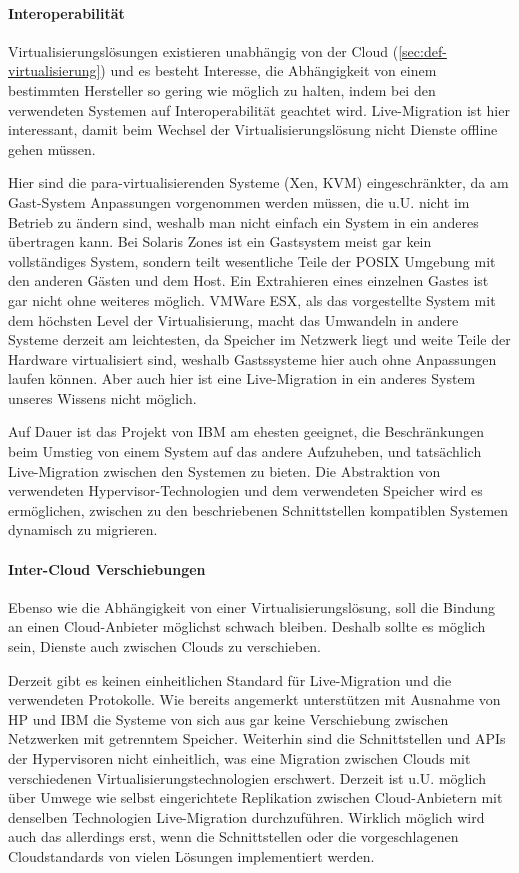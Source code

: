 \paragraph*{Interoperabilität}
Virtualisierungslösungen existieren unabhängig von der Cloud
(\autoref{sec:def-virtualisierung}) und es besteht Interesse, die
Abhängigkeit von einem bestimmten Hersteller so gering wie möglich zu
halten, indem bei den verwendeten Systemen auf Interoperabilität
geachtet wird. Live-Migration ist hier interessant, damit beim Wechsel
der Virtualisierungslösung nicht Dienste offline gehen müssen.

Hier sind die para-virtualisierenden Systeme (Xen, \ac{KVM})
eingeschränkter, da am Gast-System Anpassungen vorgenommen werden
müssen, die u.U. nicht im Betrieb zu ändern sind, weshalb man nicht
einfach ein System in ein anderes übertragen kann. Bei Solaris Zones
ist ein Gastsystem meist gar kein vollständiges System, sondern teilt
wesentliche Teile der POSIX Umgebung mit den anderen Gästen und dem
Host. Ein Extrahieren eines einzelnen Gastes ist gar nicht ohne
weiteres möglich. VMWare ESX, als das vorgestellte System mit dem
höchsten Level der Virtualisierung, macht das Umwandeln in andere
Systeme derzeit am leichtesten, da Speicher im Netzwerk liegt und
weite Teile der Hardware virtualisiert sind, weshalb Gastssysteme hier
auch ohne Anpassungen laufen können. Aber auch hier ist eine
Live-Migration in ein anderes System unseres Wissens nicht möglich.

Auf Dauer ist das \reservoir Projekt von IBM am ehesten geeignet, die
Beschränkungen beim Umstieg von einem System auf das andere
Aufzuheben, und tatsächlich Live-Migration zwischen den Systemen zu
bieten. Die Abstraktion von verwendeten Hypervisor-Technologien und
dem verwendeten Speicher wird es ermöglichen, zwischen zu den
beschriebenen Schnittstellen kompatiblen Systemen dynamisch zu
migrieren.

\paragraph*{Inter-Cloud Verschiebungen}
Ebenso wie die Abhängigkeit von einer Virtualisierungslösung, soll die
Bindung an einen Cloud-Anbieter möglichst schwach bleiben. Deshalb
sollte es möglich sein, Dienste auch zwischen Clouds zu verschieben.

Derzeit gibt es keinen einheitlichen Standard für Live-Migration und
die verwendeten Protokolle. Wie bereits angemerkt unterstützen mit
Ausnahme von HP und IBM die Systeme von sich aus gar keine
Verschiebung zwischen Netzwerken mit getrenntem Speicher. Weiterhin
sind die Schnittstellen und APIs der Hypervisoren nicht einheitlich,
was eine Migration zwischen Clouds mit verschiedenen
Virtualisierungstechnologien erschwert. Derzeit ist u.U. möglich über
Umwege wie selbst eingerichtete Replikation zwischen Cloud-Anbietern
mit denselben Technologien Live-Migration durchzuführen. Wirklich
möglich wird auch das allerdings erst, wenn die \reservoir
Schnittstellen oder die vorgeschlagenen Cloudstandards von vielen
Lösungen implementiert werden.

